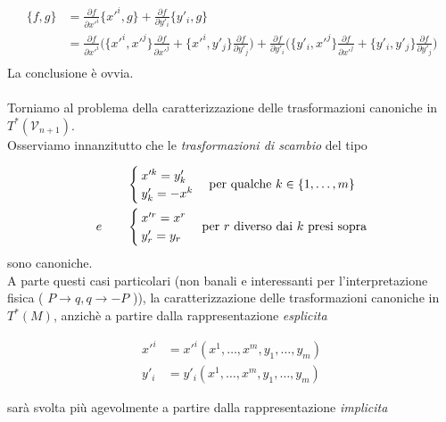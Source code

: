 \begin{equation*}
\begin{split}
  \{f,g\}&= \frac{\partial f}{\partial x'^i}\{x'^i,g\}+\frac{\partial f}{\partial y'_i} \{y'_i,g\}  \\
&= \frac{\partial f}{\partial x'^i}\biggl(\{x'^i,x'^j\} \frac{\partial f}{\partial x'^j}+\{x'^i,y'_j\} \frac{\partial f}{\partial y'_j} \biggr) + \frac{\partial f}{\partial y'_i}\biggl(\{y'_i,x'^j\} \frac{\partial f}{\partial x'^j}+\{y'_i,y'_j\} \frac{\partial f}{\partial y'_j} \biggr)\\
\end{split}
\end{equation*}
La conclusione è ovvia.
\\
\\
Torniamo al problema della caratterizzazione delle trasformazioni canoniche in $ T^*(\mathcal{V}_{n+1}) $.\\
Osserviamo innanzitutto che le \textit{trasformazioni di scambio} del tipo \label{pag:trasf_scambio}

\begin{equation*}
\begin{split} 
&
\begin{cases}
x'^k = y'_k \\
y'_k = - x^k\\
\end{cases}
\text{per qualche } k \in \{1, \dots , m\} \\
e~~~~~~&
\begin{cases}
x'^r = x^r \\
y'_r = y_r\\
\end{cases}
\text{per $ r $ diverso dai $ k $ presi sopra} \\
\end{split}
\end{equation*}
sono canoniche.\\ 
A parte questi casi particolari (non banali e interessanti per l'interpretazione fisica ( $ P \rightarrow q, q \rightarrow -P $ )), la caratterizzazione delle trasformazioni canoniche in $ T^* (M) $, anzichè a partire dalla rappresentazione \textit{esplicita}

\begin{align*}
x'^i &= x'^i(x^1, \dots , x^m, y_1, \dots , y_m)
\\
y'_i &= y'_i(x^1, \dots , x^m, y_1, \dots , y_m)
\end{align*}

sarà svolta più agevolmente a partire dalla rappresentazione \textit{implicita}

